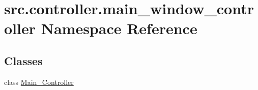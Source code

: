 \hypertarget{namespacesrc_1_1controller_1_1main__window__controller}{}\section{src.\+controller.\+main\+\_\+window\+\_\+controller Namespace Reference}
\label{namespacesrc_1_1controller_1_1main__window__controller}
\subsection*{Classes}
\begin{DoxyCompactItemize}
\item 
class \hyperlink{classsrc_1_1controller_1_1main__window__controller_1_1Main__Controller}{Main\+\_\+\+Controller}
\end{DoxyCompactItemize}
